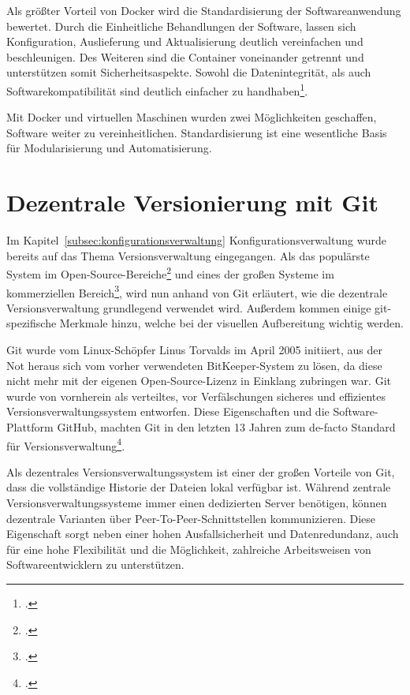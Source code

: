 Als größter Vorteil von Docker wird die Standardisierung der Softwareanwendung bewertet. Durch die Einheitliche Behandlungen der Software, lassen sich Konfiguration, Auslieferung und Aktualisierung deutlich vereinfachen und beschleunigen. Des Weiteren sind die Container voneinander getrennt und unterstützen somit Sicherheitsaspekte. Sowohl die Datenintegrität, als auch Softwarekompatibilität sind deutlich einfacher zu handhaben\footcite[vgl.][]{ten-benefits-docker}.

Mit Docker und virtuellen Maschinen wurden zwei Möglichkeiten geschaffen, Software weiter zu vereinheitlichen. Standardisierung ist eine wesentliche Basis für Modularisierung und Automatisierung.

\section{Dezentrale Versionierung mit Git}
\label{distributed-vcs-git}

Im Kapitel~\ref{subsec:konfigurationsverwaltung} Konfigurationsverwaltung wurde bereits auf das Thema Versionsverwaltung 
eingegangen. Als das populärste System im Open-Source-Bereiche\footcite[vgl.][]{openhub-pie-chart} und eines der großen Systeme 
im kommerziellen Bereich\footcite[vgl.][]{g2crowd2018}, wird nun anhand von Git erläutert, wie die dezentrale Versionsverwaltung 
grundlegend verwendet wird. Außerdem kommen einige git-spezifische Merkmale hinzu, welche bei der visuellen Aufbereitung 
wichtig werden.

Git wurde vom Linux-Schöpfer Linus Torvalds im April 2005 initiiert, aus der Not heraus sich vom vorher verwendeten \glqq BitKeeper\grqq{}-System zu lösen, da diese nicht mehr mit der eigenen Open-Source-Lizenz in Einklang zubringen war. Git wurde von vornherein als verteiltes, vor Verfälschungen sicheres und effizientes Versionsverwaltungssystem entworfen. 
Diese Eigenschaften und die Software-Plattform \glqq GitHub\grqq{}, machten Git in den letzten 13 Jahren zum de-facto Standard für Versionsverwaltung\footcite[vgl.][]{heise-torvald-git2015}.

Als dezentrales Versionsverwaltungssystem ist einer der großen Vorteile von Git, dass die vollständige Historie der Dateien lokal verfügbar ist. Während zentrale Versionsverwaltungssysteme immer einen dedizierten Server benötigen, können dezentrale Varianten über Peer-To-Peer-Schnittstellen kommunizieren. Diese Eigenschaft sorgt neben einer hohen Ausfallsicherheit und Datenredundanz, auch für eine hohe Flexibilität und die Möglichkeit, zahlreiche Arbeitsweisen von Softwareentwicklern zu unterstützen.

